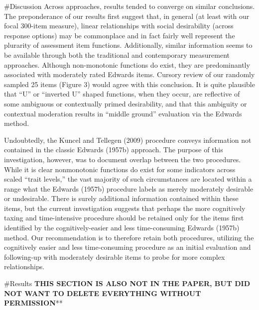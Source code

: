 \documentclass[
  english,
  ,jou]{apa6}
\begin{document}
\#Discussion
Across approaches, results tended to converge on similar conclusions. The preponderance of our results first suggest that, in general (at least with our focal 300-item measure), linear relationships with social desirability (across response options) may be commonplace and in fact fairly well represent the plurarity of assessment item functions. Additionally, similar information seems to be available through both the traditional and contemporary measurement approaches. Although non-monotonic functions do exist, they are predominantly associated with moderately rated Edwards items. Cursory review of our randomly sampled 25 items (Figure 3) would agree with this conclusion. It is quite plausible that \enquote{U} or \enquote{inverted U} shaped functions, when they occur, are reflective of some ambiguous or contextually primed desirability, and that this ambiguity or contextual moderation results in \enquote{middle ground} evaluation via the Edwards method.

Undoubtedly, the Kuncel and Tellegen (2009) procedure conveys information not contained in the classic Edwards (1957b) approach. The purpose of this investigation, however, was to document overlap between the two procedures. While it is clear nonmonotonic functions do exist for some indicators across scaled \enquote{trait levels,} the vast majority of such circumstances are located within a range what the Edwards (1957b) procedure labels as merely moderately desirable or undesirable. There is surely additional information contained within these items, but the current investigation suggests that perhaps the more cognitively taxing and time-intensive procedure should be retained only for the items first identified by the cognitively-easier and less time-consuming Edwards (1957b) method. Our recommendation is to therefore retain both procedures, utilizing the cognitively easier and less time-consuming procedure as an initial evaluation and following-up with moderately desirable items to probe for more complex relationships.

\#Results \textbf{THIS SECTION IS ALSO NOT IN THE PAPER, BUT DID NOT WANT TO DELETE EVERYTHING WITHOUT PERMISSION}**
\end{document}
